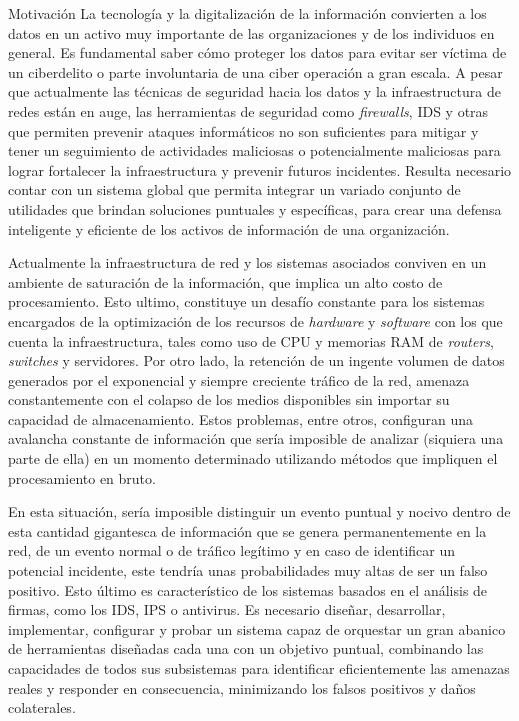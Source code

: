     \begin{section}{Motivación}
        La tecnología y la digitalización de la información convierten a los datos en un activo muy importante de las organizaciones y de los individuos en general. Es fundamental saber cómo proteger los datos para evitar ser víctima de un ciberdelito o parte involuntaria de una ciber operación a gran escala. A pesar que actualmente las técnicas de seguridad hacia los datos y la infraestructura de redes están en auge, las herramientas de seguridad como \textit{firewalls}, IDS y otras que permiten prevenir ataques informáticos no son suficientes para mitigar y tener un seguimiento de actividades maliciosas o potencialmente maliciosas para lograr fortalecer la infraestructura y prevenir futuros incidentes. Resulta necesario contar con un sistema global que permita integrar un variado conjunto de utilidades que brindan soluciones puntuales y específicas, para crear una defensa inteligente y eficiente de los activos de información de una organización. \par
        Actualmente la infraestructura de red y los sistemas asociados conviven en un ambiente de saturación de la información, que implica un alto costo de procesamiento. Esto ultimo, constituye un desafío constante para los sistemas encargados de la optimización de los recursos de \textit{hardware} y \textit{software} con los que cuenta la infraestructura, tales como uso de CPU y memorias RAM de \textit{routers}, \textit{switches} y servidores. Por otro lado, la retención de un ingente volumen de datos generados por el exponencial y siempre creciente tráfico de la red, amenaza constantemente con el colapso de los medios disponibles sin importar su capacidad de almacenamiento. Estos problemas, entre otros, configuran una avalancha constante de información que sería imposible de analizar (siquiera una parte de ella) en un momento determinado utilizando métodos que impliquen el procesamiento en bruto.  \par
        En esta situación, sería imposible distinguir un evento puntual y nocivo dentro de esta cantidad gigantesca de información que se genera permanentemente en la red, de un evento normal o de tráfico legítimo y en caso de identificar un potencial incidente, este tendría unas probabilidades muy altas de ser un falso positivo. Esto último es característico de los sistemas basados en el análisis de firmas, como los IDS, IPS o antivirus. Es necesario diseñar, desarrollar, implementar, configurar y probar un sistema capaz de orquestar un gran abanico de herramientas diseñadas cada una con un objetivo puntual, combinando las capacidades de todos sus subsistemas para identificar eficientemente las amenazas reales y responder en consecuencia, minimizando los falsos positivos y daños colaterales.

    \end{section}